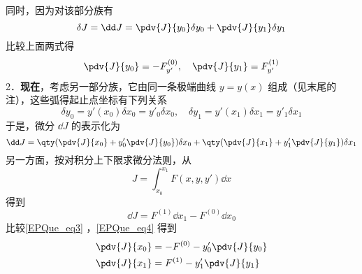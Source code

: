同时，因为对该部分族有
\begin{equation}
\delta J=\dd J=\pdv{J}{y_0}\delta y_0+\pdv{J}{y_1}\delta y_1
\end{equation}
比较上面两式得
\begin{equation}
\pdv{J}{y_0}=-F_{y'}^{(0)},\quad \pdv{J}{y_1}=F_{y'}^{(1)}
\end{equation}
2．\textbf{现在}，考虑另一部分族，它由同一条极端曲线 $y=y(x)$ 组成（见末尾的注），这些弧得起止点坐标有下列关系
\begin{equation}
\delta y_0=y'(x_0)\delta x_0=y'_0\delta x_0,\quad \delta y_1=y'(x_1)\delta x_1=y'_1\delta x_1
\end{equation}
于是，微分 $\dd J$ 的表示化为
\begin{equation}\label{EPQue_eq3}
\dd J=\qty(\pdv{J}{x_0}+y'_0\pdv{J}{y_0})\delta x_0+\qty(\pdv{J}{x_1}+y'_1\pdv{J}{y_1})\delta x_1
\end{equation}
另一方面，按对积分上下限求微分法则，从
\begin{equation}
J=\int_{x_0}^{x_1}F(x,y,y')\dd x
\end{equation}
得到
\begin{equation}\label{EPQue_eq4}
\dd J=F^{(1)}\dd x_1-F^{(0)}\dd x_0
\end{equation}
比较\autoref{EPQue_eq3} ，\autoref{EPQue_eq4} 得到
\begin{equation}
\begin{aligned}
&\pdv{J}{x_0}=-F^{(0)}-y'_0\pdv{J}{y_0}\\
&\pdv{J}{x_1}=F^{(1)}-y'_1\pdv{J}{y_1}
\end{aligned}
\end{equation}

